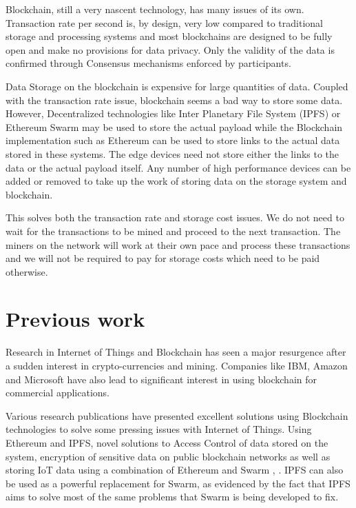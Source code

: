 \documentclass[11pt,openright]{report}
\begin{document}
Blockchain, still a very nascent technology, has many issues of its own. Transaction rate per second is, by design, very low compared to traditional storage and processing systems and most blockchains are designed to be fully open and make no provisions for data privacy. Only the validity of the data is confirmed through Consensus mechanisms enforced by participants.

Data Storage on the blockchain is expensive for large quantities of data. Coupled with the transaction rate issue, blockchain seems a bad way to store some data. However, Decentralized technologies like Inter Planetary File System (IPFS) or Ethereum Swarm may be used to store the actual payload while the Blockchain implementation such as Ethereum can be used to store links to the actual data stored in these systems. The edge devices need not store either the links to the data or the actual payload itself. Any number of high performance devices can be added or removed to take up the work of storing data on the storage system and blockchain. 

This solves both the transaction rate and storage cost issues. We do not need to wait for the transactions to be mined and proceed to the next transaction. The miners on the network will work at their own pace and process these transactions and we will not be required to pay for storage costs which need to be paid otherwise.

\section{Previous work}\label{section:previouswork}
Research in Internet of Things and Blockchain has seen a major resurgence after a sudden interest in crypto-currencies and mining. Companies like IBM, Amazon and Microsoft have also lead to significant interest in using blockchain for commercial applications. 

Various research publications have presented excellent solutions using Blockchain technologies to solve some pressing issues with Internet of Things. Using Ethereum and IPFS, novel solutions to  Access Control of data \cite{8400511} stored on the system, encryption of sensitive data on public blockchain networks \cite{8400511} as well as storing IoT data using a combination of Ethereum and Swarm \cite{8525388}, \cite{8634961}. IPFS can also be used as a powerful replacement for Swarm, as evidenced by the fact that IPFS aims to solve most of the same problems that Swarm is being developed to fix.
\end{document}
